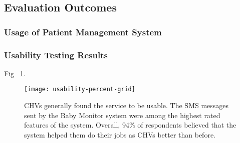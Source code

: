 \subsection{Evaluation Outcomes}
\subsubsection{Usage of Patient Management System}

\subsubsection{Usability Testing Results}
Fig ~\ref{fig:barchart}.
\begin{figure}[h]
	\begin{center}
	\texttt{[image: usability-percent-grid]}
	\end{center}
	\caption{CHVs generally found the service to be usable. The SMS messages sent by the Baby Monitor system were among the highest rated features of the system. Overall, 94\% of respondents believed that the system helped them do their jobs as CHVs better than before.}
	\label{fig:barchart}
\end{figure}

